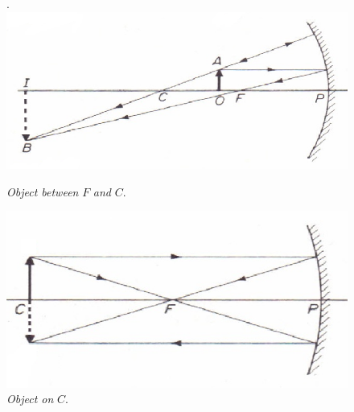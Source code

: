\documentclass{scrartcl}
\begin{document}
    \begin{figure}[H]
        \centering
        \begin{minipage}[b]{0.49\textwidth}.
        \includegraphics[width=\textwidth]{concave3.eps}
        \caption{\textit{Object between} $F$ \textit{and} $C$.}
        \end{minipage}
        \hfill
        \begin{minipage}[b]{0.49\textwidth}
            \includegraphics[width=\textwidth]{concave4.eps}
            \caption{\textit{Object on} $C$.}
        \end{minipage}
    \end{figure}
\end{document}
